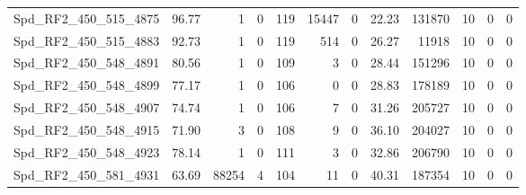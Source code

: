 \begin{longtable}[c]{@{}lrrrrrrrrrrr@{}}
Spd\_RF2\_450\_515\_4875      & 96.77                  & 1                       & 0                       & 119                    & 15447                   & 0                       & 22.23                   & 131870                   & 10                       & 0                        & 0                        \\
Spd\_RF2\_450\_515\_4883      & 92.73                  & 1                       & 0                       & 119                    & 514                     & 0                       & 26.27                   & 11918                    & 10                       & 0                        & 0                        \\
Spd\_RF2\_450\_548\_4891      & 80.56                  & 1                       & 0                       & 109                    & 3                       & 0                       & 28.44                   & 151296                   & 10                       & 0                        & 0                        \\
Spd\_RF2\_450\_548\_4899      & 77.17                  & 1                       & 0                       & 106                    & 0                       & 0                       & 28.83                   & 178189                   & 10                       & 0                        & 0                        \\
Spd\_RF2\_450\_548\_4907      & 74.74                  & 1                       & 0                       & 106                    & 7                       & 0                       & 31.26                   & 205727                   & 10                       & 0                        & 0                        \\
Spd\_RF2\_450\_548\_4915      & 71.90                  & 3                       & 0                       & 108                    & 9                       & 0                       & 36.10                   & 204027                   & 10                       & 0                        & 0                        \\
Spd\_RF2\_450\_548\_4923      & 78.14                  & 1                       & 0                       & 111                    & 3                       & 0                       & 32.86                   & 206790                   & 10                       & 0                        & 0                        \\
Spd\_RF2\_450\_581\_4931      & 63.69                  & 88254                   & 4                       & 104                    & 11                      & 0                       & 40.31                   & 187354                   & 10                       & 0                        & 0                        \\

\end{longtable}
